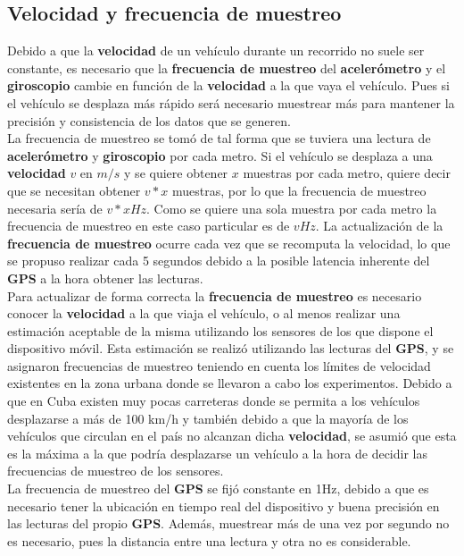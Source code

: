 	\subsection{Velocidad y frecuencia de muestreo}
		Debido a que la \textbf{velocidad} de un vehículo durante un recorrido no suele ser constante, es necesario que la \textbf
		{frecuencia de muestreo} del \textbf{acelerómetro} y el \textbf{giroscopio} cambie en función de la \textbf{velocidad}
		a la que vaya el vehículo. Pues si el vehículo se desplaza más rápido será necesario muestrear más para mantener la
		precisión y consistencia de los datos que se generen.\\
		\indent La frecuencia de muestreo se tomó de tal forma que se tuviera una lectura de \textbf{acelerómetro} y \textbf
		{giroscopio} por cada metro. Si el vehículo se desplaza a una \textbf{velocidad} $v$ en $m/s$ y se quiere obtener
		$x$ muestras por cada metro, quiere decir que se necesitan obtener $v * x$ muestras, por lo que la frecuencia de muestreo
		necesaria sería de $v * x Hz$. Como se quiere una sola muestra por cada metro la frecuencia de muestreo
		en este caso particular es de $v Hz$. La actualización de la \textbf{frecuencia de muestreo} ocurre cada vez que se recomputa
		la velocidad, lo que se propuso realizar cada 5 segundos debido a la posible latencia inherente del \textbf{GPS} a la hora
		obtener las lecturas.\\
		\indent Para actualizar de forma correcta la \textbf{frecuencia de muestreo} es necesario conocer la \textbf{velocidad}
		a la que viaja el vehículo, o al menos realizar una estimación aceptable de la misma utilizando los sensores de
		los que dispone el dispositivo móvil. Esta estimación se realizó utilizando las lecturas del \textbf{GPS}, y se 
		asignaron frecuencias de muestreo teniendo en cuenta los límites de velocidad existentes en la zona urbana donde 
		se llevaron a cabo los experimentos. Debido a que en Cuba existen muy pocas carreteras donde se permita a
		los vehículos desplazarse a más de 100 km/h y también debido a que la mayoría de los vehículos que circulan en
		el país no alcanzan dicha \textbf{velocidad}, se asumió que esta es la máxima a la que podría desplazarse un
		vehículo a la hora de decidir las frecuencias de muestreo de los sensores.\\
		\indent La frecuencia de muestreo del \textbf{GPS} se fijó constante en 1Hz, debido a que es necesario tener 
		la ubicación en tiempo real del dispositivo y buena precisión en las lecturas del propio \textbf{GPS}. Además, 
		muestrear más de una vez por segundo no es necesario, pues la distancia entre una lectura y otra no es considerable.\\

